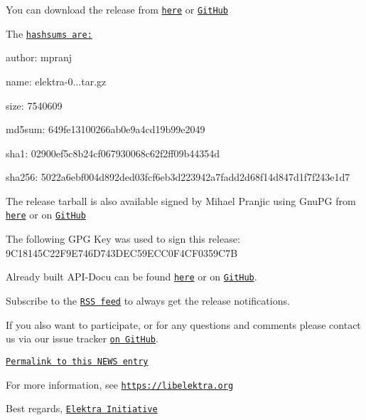 You can download the release from \href{https://www.libelektra.org/ftp/elektra/releases/elektra-0.9.3.tar.gz}{\tt here} or \href{https://github.com/ElektraInitiative/ftp/blob/master/releases/elektra-0.9.3.tar.gz?raw=true}{\tt Git\+Hub}

The \href{https://github.com/ElektraInitiative/ftp/blob/master/releases/elektra-0.9.3.tar.gz.hashsum?raw=true}{\tt hashsums are\+:}


\begin{DoxyItemize}
\item author\+: mpranj
\item name\+: elektra-\/0...\+tar.\+gz
\item size\+: 7540609
\item md5sum\+: 649fe13100266ab0e9a4cd19b99e2049
\item sha1\+: 02900ef5c8b24cf067930068c62f2ff09b44354d
\item sha256\+: 5022a6ebf004d892ded03fcf6eb3d223942a7fadd2d68f14d847d1f7f243e1d7
\end{DoxyItemize}

The release tarball is also available signed by Mihael Pranjic using Gnu\+PG from \href{https://www.libelektra.org/ftp/elektra/releases/elektra-0.9.3.tar.gz.gpg}{\tt here} or on \href{https://github.com/ElektraInitiative/ftp/blob/master/releases/elektra-0.9.3.tar.gz.gpg?raw=true}{\tt Git\+Hub}

The following G\+PG Key was used to sign this release\+: 9\+C18145\+C22\+F9\+E746\+D743\+D\+E\+C59\+E\+C\+C0\+F4\+C\+F0359\+C7B

Already built A\+P\+I-\/\+Docu can be found \href{https://doc.libelektra.org/api/0.9.3/html/}{\tt here} or on \href{https://github.com/ElektraInitiative/doc/tree/master/api/0.9.3}{\tt Git\+Hub}.

Subscribe to the \href{https://www.libelektra.org/news/feed.rss}{\tt R\+SS feed} to always get the release notifications.

If you also want to participate, or for any questions and comments please contact us via our issue tracker \href{http://issues.libelektra.org}{\tt on Git\+Hub}.

\href{https://www.libelektra.org/news/0.9.3-release}{\tt Permalink to this N\+E\+WS entry}

For more information, see \href{https://libelektra.org}{\tt https\+://libelektra.\+org}

Best regards, \href{https://www.libelektra.org/developers/authors}{\tt Elektra Initiative} 